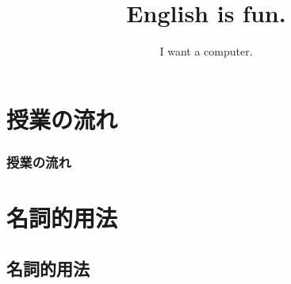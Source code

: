 \documentclass[aspectratio=169,xcolor={dvipsnames,table}]{beamer}
\title{English is fun.}
\subtitle{I want a computer.}
\author{}
\institute[]{}
\date[]
\begin{document}
\begin{frame}[plain]
  \titlepage
\end{frame}

\section*{授業の流れ}
\begin{frame}[plain]
  \frametitle{授業の流れ}
  \tableofcontents
\end{frame}

\section{名詞的用法}
\subsection{名詞的用法}
\end{document}
